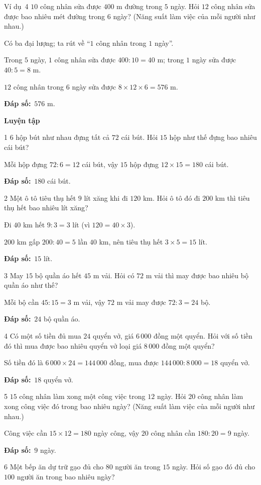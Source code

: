 \documentclass[11pt]{article}
\newif\ifsol \solfalse
\providecommand{\AnsWord}{Đáp số}
\newcommand{\dapso}[1]{\par\textbf{\AnsWord:}\ #1}
\newcommand{\guide}{\par\vspace{4pt}{\bfseries\color{tmBlue}\GuideWord}\par\vspace{3pt}\nopagebreak}
\newcommand{\probsol}[1]{%
  \begin{lrbox}{\solmeasure}\begin{minipage}{\dimexpr\linewidth-24pt\relax}#1\end{minipage}\end{lrbox}%
  \ifsol
    \begin{solbox}#1\end{solbox}%
  \else
    \setlength{\solht}{\dimexpr\ht\solmeasure+\dp\solmeasure+0.85cm\relax}%
    \ifdim\solht<1.35cm\setlength{\solht}{1.35cm}\fi
    \begin{tcolorbox}[colback=white,colframe=Line,boxrule=0.8pt,arc=5pt,
      left=8pt,right=8pt,top=4pt,bottom=4pt,height=\solht]{\footnotesize\color{Slate}\itshape\WorkWord}\end{tcolorbox}%
  \fi}
\newcommand{\dividerbar}[1]{\par\vspace{0.6em}\noindent
  \begin{tcolorbox}[enhanced,frame hidden,interior hidden,borderline west={5pt}{0pt}{ProbBlue},
    colback=white,left=12pt,right=12pt,top=5pt,bottom=5pt,arc=4pt]
  {\large\bfseries\color{ProbBlue} #1}\end{tcolorbox}\vspace{0.4em}}
\newcommand{\gap}{\vspace{0.3cm}}
\def\GuideWord{Hướng dẫn giải.}
\def\WorkWord{Bài làm:}
\def\AnsWord{Đáp số}
\def\ExWord{Ví dụ}
\begin{document}
\gap
\begin{exbox}{\ExWord\ 4}
$10$ công nhân sửa được $400$ m đường trong $5$ ngày. Hỏi $12$ công nhân sửa được bao nhiêu mét đường trong $6$ ngày? (Năng suất làm việc của mỗi người như nhau.)
\guide
Có ba đại lượng; ta rút về ``$1$ công nhân trong $1$ ngày''.\par
Trong $5$ ngày, $1$ công nhân sửa được $400:10=40$ m; trong $1$ ngày sửa được $40:5=8$ m.\par
$12$ công nhân trong $6$ ngày sửa được $8\times12\times6=576$ m.
\dapso{$576$ m.}
\end{exbox}
\dividerbar{Luyện tập}
\begin{probbox}{1}{\relax}
$6$ hộp bút như nhau đựng tất cả $72$ cái bút. Hỏi $15$ hộp như thế đựng bao nhiêu cái bút?
\end{probbox}
\probsol{
Mỗi hộp đựng $72:6=12$ cái bút, vậy $15$ hộp đựng $12\times15=180$ cái bút.
\dapso{$180$ cái bút.}}
\gap
\begin{probbox}{2}{\relax}
Một ô tô tiêu thụ hết $9$ lít xăng khi đi $120$ km. Hỏi ô tô đó đi $200$ km thì tiêu thụ hết bao nhiêu lít xăng?
\end{probbox}
\probsol{
Đi $40$ km hết $9:3=3$ lít (vì $120=40\times3$).\par $200$ km gấp $200:40=5$ lần $40$ km, nên tiêu thụ hết $3\times5=15$ lít.
\dapso{$15$ lít.}}
\gap
\begin{probbox}{3}{\relax}
May $15$ bộ quần áo hết $45$ m vải. Hỏi có $72$ m vải thì may được bao nhiêu bộ quần áo như thế?
\end{probbox}
\probsol{
Mỗi bộ cần $45:15=3$ m vải, vậy $72$ m vải may được $72:3=24$ bộ.
\dapso{$24$ bộ quần áo.}}
\gap
\begin{probbox}{4}{\relax}
Có một số tiền đủ mua $24$ quyển vở, giá $6\,000$ đồng một quyển. Hỏi với số tiền đó thì mua được bao nhiêu quyển vở loại giá $8\,000$ đồng một quyển?
\end{probbox}
\probsol{
Số tiền đó là $6\,000\times24=144\,000$ đồng, mua được $144\,000:8\,000=18$ quyển vở.
\dapso{$18$ quyển vở.}}
\gap
\begin{probbox}{5}{\relax}
$15$ công nhân làm xong một công việc trong $12$ ngày. Hỏi $20$ công nhân làm xong công việc đó trong bao nhiêu ngày? (Năng suất làm việc của mỗi người như nhau.)
\end{probbox}
\probsol{
Công việc cần $15\times12=180$ ngày công, vậy $20$ công nhân cần $180:20=9$ ngày.
\dapso{$9$ ngày.}}
\gap
\begin{probbox}{6}{\relax}
Một bếp ăn dự trữ gạo đủ cho $80$ người ăn trong $15$ ngày. Hỏi số gạo đó đủ cho $100$ người ăn trong bao nhiêu ngày?
\end{probbox}
\end{document}
